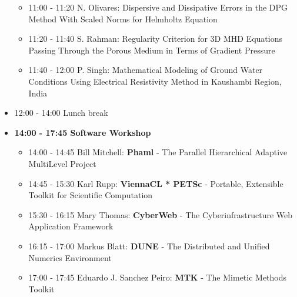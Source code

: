 \documentclass[10pt, A4]{article}%
\begin{document}
\begin{itemize}
\begin{itemize}
    \item 11:00 - 11:20 {N. Olivares}: {Dispersive and Dissipative Errors in the DPG Method With Scaled Norms for Helmholtz Equation}
    \item 11:20 - 11:40 {S. Rahman}: {Regularity Criterion for 3D MHD Equations Passing Through the Porous Medium in Terms of Gradient Pressure} %
    \item 11:40 - 12:00 {P. Singh}: {Mathematical Modeling of Ground Water Conditions Using Electrical Resistivity Method in Kaushambi Region, India} %
  \end{itemize}
  \item 12:00 - 14:00 Lunch break
  \item {\bf 14:00 - 17:45 Software Workshop}
  \begin{itemize}
    \item 14:00 - 14:45 Bill Mitchell: {\bf Phaml} - The Parallel Hierarchical Adaptive MultiLevel Project
    \item 14:45 - 15:30 Karl Rupp: {\bf ViennaCL * PETSc} - Portable, Extensible Toolkit for Scientific Computation
    \item 15:30 - 16:15 Mary Thomas: {\bf CyberWeb} - The Cyberinfrastructure Web Application Framework
    \item 16:15 - 17:00 Markus Blatt: {\bf DUNE} - The Distributed and Unified Numerics Environment
    \item 17:00 - 17:45 Eduardo J. Sanchez Peiro: {\bf MTK} - The Mimetic Methods Toolkit
  \end{itemize}

\end{itemize}
\end{document}
